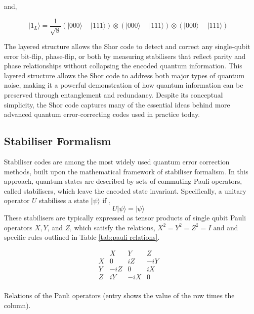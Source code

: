 and,

\begin{equation}
    |1_L\rangle=\frac{1}{\sqrt{8}}(|000\rangle-|111\rangle)\otimes(|000\rangle-|111\rangle)\otimes(|000\rangle-|111\rangle)
\end{equation}

The layered structure allows the Shor code to detect and correct any single-qubit error bit-flip, phase-flip, or both by measuring stabilisers that reflect parity and phase relationships without collapsing the encoded quantum information. This layered structure allows the Shor code to address both major types of quantum noise, making it a powerful demonstration of how quantum information can be preserved through entanglement and redundancy. Despite its conceptual simplicity, the Shor code captures many of the essential ideas behind more advanced quantum error-correcting codes used in practice today.

\subsection{Stabiliser Formalism}
Stabiliser codes are among the most widely used quantum error correction methods, built upon the mathematical framework of stabiliser formalism. In this approach, quantum states are described by sets of commuting Pauli operators, called stabilisers, which leave the encoded state invariant. Specifically, a unitary operator \(U\) stabilises a state |\(\psi\rangle\) if ,
\begin{equation}
    U|\psi\rangle=|\psi\rangle
\end{equation}
These stabilisers are typically expressed as tensor products of single qubit Pauli operators \(X, Y\), and \(Z\), which satisfy the relations, \(X^2=Y^2=Z^2=I\) and and specific rules outlined in Table \ref{tab:pauli relations}.

\begin{table}[h]
\label{}
\centering
\[
\begin{array}{c|ccc}
 & X & Y & Z \\
\hline
X & 0 & iZ & -iY \\
Y & -iZ & 0 & iX \\
Z & iY & -iX & 0 \\
\end{array}
\]
\caption{Relations of the Pauli operators (entry shows the value of the row times the column).}
\label{tab:pauli relations}
\end{table}

